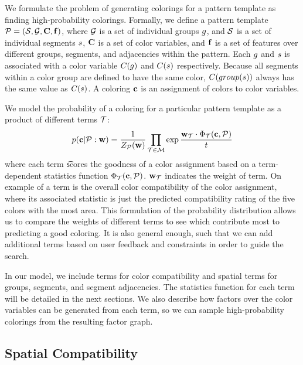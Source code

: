 We formulate the problem of generating colorings for a pattern template as finding high-probability colorings. Formally, we define a pattern template $\mathcal{P} = (\mathcal{S}, \mathcal{G}, \mathbf{C}, \mathbf{f})$, where $\mathcal{G}$ is a set of individual groups $g$, and $\mathcal{S}$ is a set of individual segments $s$, $\mathbf{C}$ is a set of color variables, and $\mathbf{f}$ is a set of features over different groups, segments, and adjacencies within the pattern. Each $g$ and $s$ is associated with a color variable $C(g)$ and $C(s)$ respectively. Because all segments within a color group are defined to have the same color, $C(group(s))$ always has the same value as $C(s)$. A coloring $\mathbf{c}$ is an assignment of colors to color variables.

We model the probability of a coloring for a particular pattern template as a product of different terms $\mathcal{T}$:   
\begin{equation*}
 p(\mathbf{c} | \mathcal{P} : \mathbf{w}) = \frac{1}{Z_{\mathcal{P}}(\mathbf{w})} \prod_{\mathcal{T} \in \mathcal{M}} \exp{\frac{ \mathbf{w}_{\mathcal{T}}\cdot \Phi_{\mathcal{T}}(\mathbf{c}, \mathcal{P})}{t}}
\end{equation*}
where each term \t scores the goodness of a color assignment based on a term-dependent statistics function $\Phi_{\mathcal{T}}(\mathbf{c},\mathcal{P})$. $\mathbf{w}_{\mathcal{T}}$ indicates the weight of term. On example of a term is the overall color compatibility of the color assignment, where its associated statistic is just the predicted compatibility rating of the five colors with the most area. This formulation of the probability distribution allows us to compare the weights of different terms to see which contribute most to predicting a good coloring. It is also general enough, such that we can add additional terms based on user feedback and constraints in order to guide the search.

In our model, we include terms for color compatibility and spatial terms for groups, segments, and segment adjacencies. The statistics function for each term will be detailed in the next sections. We also describe how factors over the color variables can be generated from each term, so we can sample high-probability colorings from the resulting factor graph.

\subsection{Spatial Compatibility}

\label{sec:spatialCompat}

